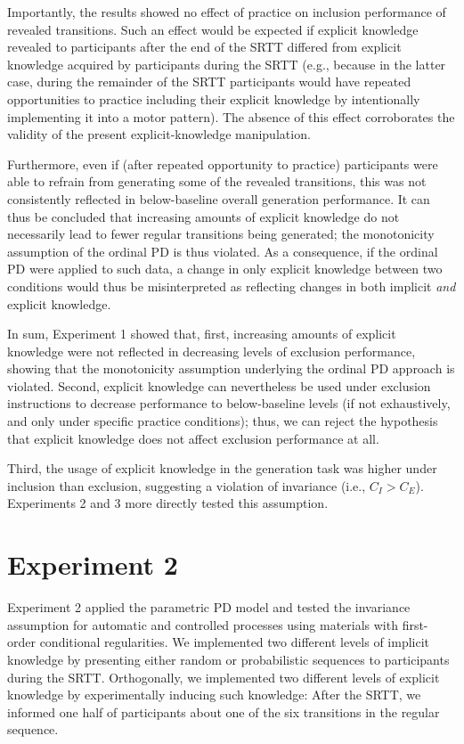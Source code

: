 \documentclass[man]{apa6}
\theoremstyle{definition}
\theoremstyle{definition}
\theoremstyle{definition}
\theoremstyle{remark}
\begin{document}
Importantly, the results showed no effect of practice on inclusion
performance of revealed transitions. Such an effect would be expected if
explicit knowledge revealed to participants after the end of the SRTT
differed from explicit knowledge acquired by participants during the
SRTT (e.g., because in the latter case, during the remainder of the SRTT
participants would have repeated opportunities to practice including
their explicit knowledge by intentionally implementing it into a motor
pattern). The absence of this effect corroborates the validity of the
present explicit-knowledge manipulation.

Furthermore, even if (after repeated opportunity to practice)
participants were able to refrain from generating some of the revealed
transitions, this was not consistently reflected in below-baseline
overall generation performance. It can thus be concluded that increasing
amounts of explicit knowledge do not necessarily lead to fewer regular
transitions being generated; the monotonicity assumption of the ordinal
PD is thus violated. As a consequence, if the ordinal PD were applied to
such data, a change in only explicit knowledge between two conditions
would thus be misinterpreted as reflecting changes in both implicit
\emph{and} explicit knowledge.

In sum, Experiment 1 showed that, first, increasing amounts of explicit
knowledge were not reflected in decreasing levels of exclusion
performance, showing that the monotonicity assumption underlying the
ordinal PD approach is violated. Second, explicit knowledge can
nevertheless be used under exclusion instructions to decrease
performance to below-baseline levels (if not exhaustively, and only
under specific practice conditions); thus, we can reject the hypothesis
that explicit knowledge does not affect exclusion performance at all.

Third, the usage of explicit knowledge in the generation task was higher
under inclusion than exclusion, suggesting a violation of invariance
(i.e., \(C_{I} > C_{E}\)). Experiments 2 and 3 more directly tested this
assumption.

\section{Experiment 2}\label{experiment-2}

Experiment 2 applied the parametric PD model and tested the invariance
assumption for automatic and controlled processes using materials with
first-order conditional regularities. We implemented two different
levels of implicit knowledge by presenting either random or
probabilistic sequences to participants during the SRTT. Orthogonally,
we implemented two different levels of explicit knowledge by
experimentally inducing such knowledge: After the SRTT, we informed one
half of participants about one of the six transitions in the regular
sequence.
\end{document}

